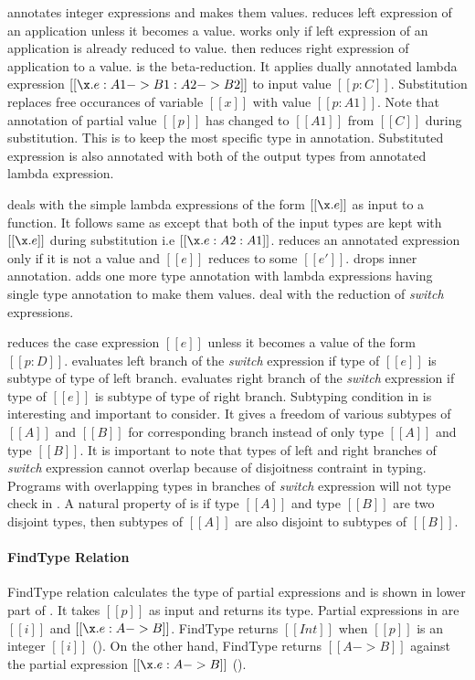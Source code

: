 annotates integer expressions and makes them values.  reduces left expression
of an application unless it becomes a value.  works only if left expression of an
application is already reduced to value.  then reduces right expression of
application to a value.
 is the beta-reduction. It applies dually annotated lambda expression
$[[\x.e : A1 -> B1 : A2 -> B2]]$ to input value $[[p:C]]$. Substitution replaces free occurances of variable
$[[x]]$ with value $[[p:A1]]$. Note that annotation of partial value $[[p]]$ has changed to $[[A1]]$ from
$[[C]]$ during substitution.
This is to keep the most specific type in annotation. Substituted expression is also
annotated with both of the output types from annotated lambda expression. 

 deals with the simple lambda expressions of the form $[[\x.e]]$ as input to a function.
It follows same as  except that both of the input types are kept with $[[\x.e]]$ during
substitution i.e $[[\x.e:A2:A1]]$.  reduces an annotated expression only if it is not a value
and $[[e]]$ reduces to some $[[e']]$.  drops inner annotation.  adds one
more type annotation with lambda expressions having single type annotation to make them values.
 deal with the reduction of \emph{switch} expressions.

 reduces the case expression $[[e]]$ unless it becomes a value of the form $[[p:D]]$.
 evaluates left branch of the \emph{switch} expression if type of $[[e]]$ is subtype
of type of left branch.
 evaluates right branch of the \emph{switch} expression if type of $[[e]]$ is subtype
of type of right branch.
Subtyping condition in  is interesting and important to consider.
It gives a freedom of various subtypes of $[[A]]$ and $[[B]]$ for corresponding branch instead of only
type $[[A]]$ and type $[[B]]$.
It is important to note that types of left and right branches of \emph{switch} expression cannot overlap
because of disjoitness contraint in typing. Programs with overlapping types in branches of \emph{switch}
expression will not type check in \cal.
A natural property of \cal is if type $[[A]]$ and type $[[B]]$ are two
disjoint types, then subtypes of $[[A]]$ are also disjoint to subtypes of $[[B]]$.

\paragraph{FindType Relation} FindType relation calculates the type of partial expressions
and is shown in lower part of . It takes $[[p]]$ as input and returns its type.
Partial expressions in \cal are $[[i]]$ and $[[\x.e: A -> B]]$.
FindType returns $[[Int]]$ when $[[p]]$ is an integer $[[i]]$ (). On the other hand,
FindType returns $[[A -> B]]$ against the partial expression $[[\x.e : A->B]]$ ().

